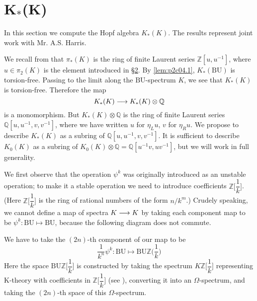 \documentclass[../main]{subfiles}
\begin{document}
\label{sec:p2c13} %

\chapter{K$_\ast$(K)}

In this section we compute the Hopf algebra $K_\ast(K)$. The results represent joint work with Mr. A.S. Harris.

We recall from \cite{atiyahbott} that $\pi_\ast(K)$ is the ring of finite Laurent series $\mathbb{Z}[u, u^{-1}]$, where $u\in\pi_2(K)$ is the element introduced in \hyperref[sec:p2c2]{\S 2}. By \eqref{lem:p2c04.1}, $K_\ast(\mathrm{BU})$ is torsion-free. Passing to the limit along the $\mathrm{BU}$-spectrum $K$, we see that $K_\ast(K)$ is torsion-free. Therefore the map \[K_\ast(K)\longrightarrow K_\ast(K)\otimes \mathbb{Q}\] is a monomorphism. But $K_\ast(K)\otimes \mathbb{Q}$ is the ring of finite Laurent series $\mathbb{Q}[u,u^{-1},v,v^{-1}]$, where we have written $u$ for $\eta_L u$, $v$ for $\eta_R u$. We propose to describe $K_\ast(K)$ as a subring of $\mathbb{Q}[u,u^{-1},v,v^{-1}]$. It is sufficient to describe $K_0(K)$ as a subring of $K_0(K)\otimes\mathbb{Q}=\mathbb{Q}[u^{-1}v,uv^{-1}]$, but we will work in full generality. 

We first observe that the operation $\psi^k$ was originally introduced as an unstable operation; to make it a stable operation we need to introduce coefficients $\mathbb{Z}\Big[\dfrac{1}{k}\Big]$. (Here $\mathbb{Z}\Big[\dfrac{1}{k}\Big]$ is the ring of rational numbers of the form $n/k^m$.) Crudely speaking, we cannot define a map of spectra $K\longrightarrow K$ by taking each component map to be $\psi^k: \mathrm{BU}\mapsto \mathrm{BU}$, because the following diagram does not commute.
\begin{center}
\end{center}
We have to take the $(2n)$-th component of our map to be \[\dfrac{1}{k^n}\psi^k:\mathrm{BU}\mapsto \mathrm{BU}\mathbb{Z}\Big(\dfrac{1}{k}\Big)\]
Here the space $\mathrm{BU}\mathbb{Z}\Big[\dfrac{1}{k}\Big]$ is constructed by taking the spectrum $K\mathbb{Z}\Big[\dfrac{1}{k}\Big]$ representing K-theory with coefficients in $\mathbb{Z}\Big[\dfrac{1}{k}\Big]$ (see \cite{adams2}), converting it into an $\Omega$-spectrum, and taking the $(2n)$-th space of this $\Omega$-spectrum. 
\end{document}
